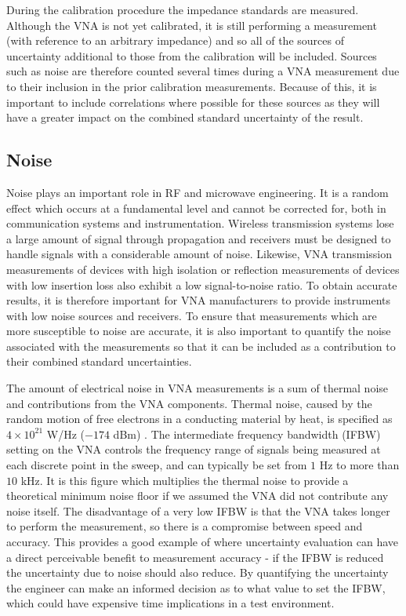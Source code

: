 \documentclass[../thesis/thesis.tex]{subfiles}
\begin{document}
During the calibration procedure the impedance standards are measured. Although the VNA is not yet calibrated, it is still performing a measurement (with reference to an arbitrary impedance) and so all of the sources of uncertainty additional to those from the calibration will be included. Sources such as noise are therefore counted several times during a VNA measurement due to their inclusion in the prior calibration measurements. Because of this, it is important to include correlations where possible for these sources as they will have a greater impact on the combined standard uncertainty of the result.

\subsection{Noise}

Noise plays an important role in RF and microwave engineering. It is a random effect which occurs at a fundamental level and cannot be corrected for, both in communication systems and instrumentation. Wireless transmission systems lose a large amount of signal through propagation and receivers must be designed to handle signals with a considerable amount of noise. Likewise, VNA transmission measurements of devices with high isolation or reflection measurements of devices with low insertion loss also exhibit a low signal-to-noise ratio. To obtain accurate results, it is therefore important for VNA manufacturers to provide instruments with low noise sources and receivers. To ensure that measurements which are more susceptible to noise are accurate, it is also important to quantify the noise associated with the measurements so that it can be included as a contribution to their combined standard uncertainties.

The amount of electrical noise in VNA measurements is a sum of thermal noise and contributions from the VNA components. Thermal noise, caused by the random motion of free electrons in a conducting material by heat, is specified as $4\times 10^{21}$ W/Hz ($-174$ dBm) \cite{Hiebel_2008}. The intermediate frequency bandwidth (IFBW) setting on the VNA controls the frequency range of signals being measured at each discrete point in the sweep, and can typically be set from $1$ Hz to more than $10$ kHz. It is this figure which multiplies the thermal noise to provide a theoretical minimum noise floor if we assumed the VNA did not contribute any noise itself. The disadvantage of a very low IFBW is that the VNA takes longer to perform the measurement, so there is a compromise between speed and accuracy. This provides a good example of where uncertainty evaluation can have a direct perceivable benefit to measurement accuracy - if the IFBW is reduced the uncertainty due to noise should also reduce. By quantifying the uncertainty the engineer can make an informed decision as to what value to set the IFBW, which could have expensive time implications in a test environment.
\end{document}
